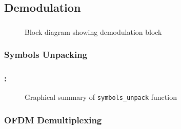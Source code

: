\documentclass[class=beamer,10pt,crop=false]{standalone}
\begin{document}
\subsection{Demodulation}
\begin{frame}
    \label{slide:dab-proc_demod}
    \frametitle{\subsecname}
    
    \begin{figure}[htbp]
        \centering
        \captionsetup{type=figure}
        \def\svgwidth{\linewidth}
        {\linespread{0.8}
            \scriptsize
            }
        \caption{Block diagram showing demodulation block}
        \label{fig:BD_Demod_All}
      \end{figure}
      
\end{frame}

\subsubsection{Symbols Unpacking}
\begin{frame}
    \label{slide:dab-proc_symbols-unpack}
    \frametitle{\subsecname : \subsubsecname}
    
    \begin{figure}[htbp]
        \centering
        \captionsetup{type=figure}
        \def\svgwidth{\linewidth}
        {\linespread{0.8}
            \scriptsize
            }
        \caption{Graphical summary of \texttt{symbols\_unpack} function}
        \label{fig:symbols_unpack}
      \end{figure}
      
\end{frame}

\subsubsection{OFDM Demultiplexing}


      
\end{document}
